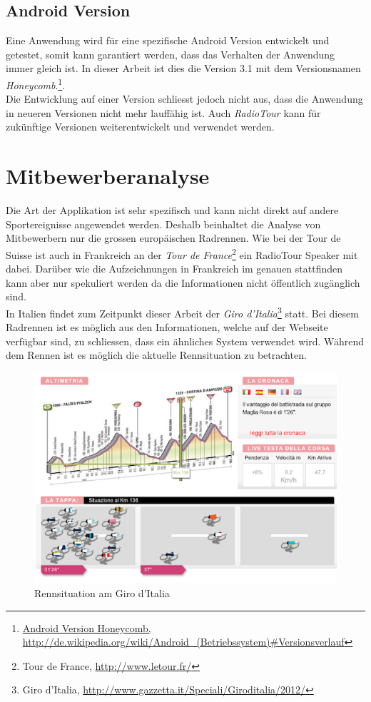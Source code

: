 \subsection{Android Version}
Eine Anwendung wird für eine spezifische Android Version entwickelt und getestet, somit kann garantiert werden, dass das Verhalten der Anwendung  immer gleich ist. In dieser Arbeit ist dies die Version 3.1 mit dem Versionsnamen \textit{Honeycomb}.\footnote{\url{Android Version Honeycomb, http://de.wikipedia.org/wiki/Android_(Betriebssystem)\#Versionsverlauf}}.
\\
Die Entwicklung auf einer Version schliesst jedoch nicht aus, dass die Anwendung in neueren Versionen nicht mehr lauffähig ist. Auch \textit{RadioTour} kann für zukünftige Versionen weiterentwickelt und verwendet werden.

\section{Mitbewerberanalyse}
Die Art der Applikation ist sehr spezifisch und kann nicht direkt auf andere Sportereignisse angewendet werden. Deshalb beinhaltet die Analyse von Mitbewerbern nur die grossen europäischen Radrennen. Wie bei der Tour de Suisse ist auch in Frankreich an der \textit{Tour de France}\footnote{Tour de France, \url{http://www.letour.fr/}} ein RadioTour Speaker mit dabei. Darüber wie die Aufzeichnungen in Frankreich im genauen stattfinden kann aber nur spekuliert werden da die Informationen nicht öffentlich zugänglich sind.
\\
In Italien findet zum Zeitpunkt dieser Arbeit der \textit{Giro d'Italia}\footnote{Giro d'Italia, \url{http://www.gazzetta.it/Speciali/Giroditalia/2012/}} statt. Bei diesem Radrennen ist es möglich aus den Informationen, welche auf der Webseite verfügbar sind, zu schliessen, dass ein ähnliches System verwendet wird. Während dem Rennen ist es möglich die aktuelle Rennsituation zu betrachten.

\begin{figure}[h!]
\caption{Rennsituation am Giro d'Italia}
\label{fig:giro}
\includegraphics[scale=0.7]{05technischerbericht/images/giro.png}
\end{figure} 


